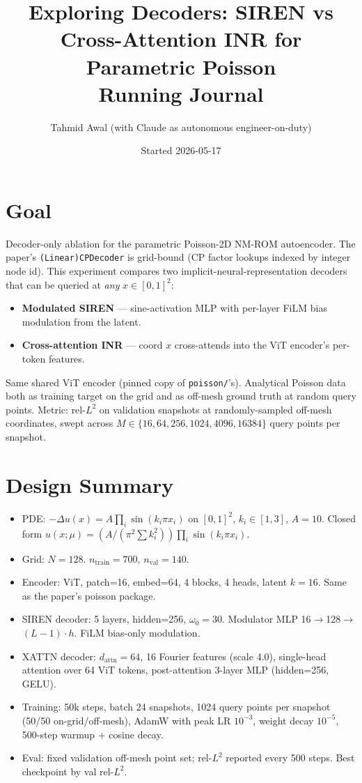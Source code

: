 \documentclass[11pt]{article}
\title{Exploring Decoders: SIREN vs Cross-Attention INR for Parametric Poisson\\
       \large Running Journal}
\author{Tahmid Awal (with Claude as autonomous engineer-on-duty)}
\date{Started 2026-05-17}
\begin{document}
\maketitle

\section{Goal}
Decoder-only ablation for the parametric Poisson-2D NM-ROM autoencoder.
The paper's \texttt{(Linear)CPDecoder} is grid-bound (CP factor lookups indexed
by integer node id). This experiment compares two implicit-neural-representation
decoders that can be queried at \emph{any} \(x \in [0,1]^2\):
\begin{itemize}
  \item \textbf{Modulated SIREN} --- sine-activation MLP with per-layer FiLM
        bias modulation from the latent.
  \item \textbf{Cross-attention INR} --- coord \(x\) cross-attends into the ViT
        encoder's per-token features.
\end{itemize}
Same shared ViT encoder (pinned copy of \texttt{poisson/}'s). Analytical Poisson
data both as training target on the grid and as off-mesh ground truth at random
query points. Metric: rel-\(L^2\) on validation snapshots at randomly-sampled
off-mesh coordinates, swept across \(M \in \{16, 64, 256, 1024, 4096, 16384\}\)
query points per snapshot.

\section{Design Summary}
\begin{itemize}
  \item PDE: \(-\Delta u(x) = A \prod_i \sin(k_i \pi x_i)\) on \([0,1]^2\),
        \(k_i \in [1,3]\), \(A=10\). Closed form
        \(u(x;\mu) = (A/(\pi^2 \sum k_i^2)) \prod_i \sin(k_i \pi x_i)\).
  \item Grid: \(N = 128\). \(n_\text{train}=700\), \(n_\text{val}=140\).
  \item Encoder: ViT, patch=16, embed=64, 4 blocks, 4 heads, latent \(k=16\).
        Same as the paper's poisson package.
  \item SIREN decoder: 5 layers, hidden=256, \(\omega_0=30\). Modulator MLP
        16$\to$128$\to$\((L-1)\cdot h\). FiLM bias-only modulation.
  \item XATTN decoder: \(d_\text{attn}=64\), 16 Fourier features (scale 4.0),
        single-head attention over 64 ViT tokens, post-attention 3-layer MLP
        (hidden=256, GELU).
  \item Training: 50k steps, batch 24 snapshots, 1024 query points per
        snapshot (50/50 on-grid/off-mesh), AdamW with peak LR \(10^{-3}\),
        weight decay \(10^{-5}\), 500-step warmup + cosine decay.
  \item Eval: fixed validation off-mesh point set; rel-\(L^2\) reported every
        500 steps. Best checkpoint by val rel-\(L^2\).
\end{itemize}
\end{document}
